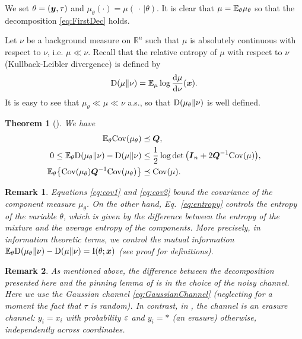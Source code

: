 \documentclass[11pt]{article}
\numberwithin{equation}{section}
\newtheorem{theorem}{Theorem}
\theoremstyle{myremark}
\newtheorem{remark}{Remark}[section]
\theoremstyle{myremark}
\theoremstyle{myexample}
\newcommand{\R}{\mathbb{R}}
\newcommand{\rmd}{\mathrm{d}}
\newcommand{\1}{\mathbf{1}}
\begin{document}
We set $\theta = ({\boldsymbol{y}},\tau)$ and $\mu_{\theta}(\cdot) = \mu(\,\cdot\, | \theta)$. 
It is clear that $\mu = {\mathbb E}_{\theta} \mu_{\theta}$ so that the decomposition
\eqref{eq:FirstDec} holds.


Let $\nu$ be a background measure on $\R^n$ such that $\mu$ is absolutely continuous
with respect to $\nu$, i.e. $\mu \ll \nu$.
Recall that the relative entropy of $\mu$ with respect to $\nu$
(Kullback-Leibler divergence) is defined by
%
\begin{align}
%
\KL(\mu \|\nu)= \E_{\mu} \log \frac{\rmd \mu}{\rmd \nu}(\bx).
%
\end{align}
%
It is easy to see that $\mu_{\theta} \ll \mu \ll \nu$ a.s., so that 
${\rm D}(\mu_{\theta}\|\nu)$ is well defined.
 
\begin{theorem}[\cite{eldan2020taming}]\label{thm:main}
We have
\begin{align}
{\mathbb E}_{\theta}{\rm Cov}(\mu_{\theta}) &\preceq {\boldsymbol{Q}},\label{eq:cov1}\\ 
0\le {\mathbb E}_{\theta} {\rm D}(\mu_{\theta}\|\nu) - {\rm D}(\mu\|\nu) &\le 
\frac{1}{2}\log \det \big({\boldsymbol{I}}_n+2{\boldsymbol{Q}}^{-1}{\rm Cov}(\mu)\big),\label{eq:entropy}\\
{\mathbb E}_{\theta} \big\{{\rm Cov}(\mu_{\theta}){\boldsymbol{Q}}^{-1}{\rm Cov}(\mu_{\theta}) \big\}  
& \preceq {\rm Cov}(\mu)\label{eq:cov2}.
\end{align} 
\end{theorem}

\begin{remark}
Equations \eqref{eq:cov1} and \eqref{eq:cov2} bound the covariance of the component
measure $\mu_{\theta}$. On the other hand, Eq.~\eqref{eq:entropy}
controls the entropy of the variable $\theta$, which is given by 
the difference between the entropy of the mixture and the average entropy of the components.
More precisely, in information theoretic terms, we control the mutual information
 ${\mathbb E}_{\theta}{\rm D}(\mu_{\theta}\|\nu) - {\rm D}(\mu\|\nu) ={\rm I}(\theta;{\boldsymbol{x}})$ (see proof for definitions).
\end{remark}

\begin{remark}
As mentioned above, the difference between the decomposition presented here
and the pinning lemma of \cite{MontanariSparse} is in the choice of the noisy channel.
Here we use the Gaussian channel \eqref{eq:GaussianChannel} 
(neglecting for a moment the fact that $\tau$ is random). In contrast,
in \cite{MontanariSparse}, the channel is an erasure channel: $y_i=x_i$ with probability ${\varepsilon}$
and $y_i=\ast$ (an erasure) otherwise, independently across coordinates.
\end{remark}
\end{document}
